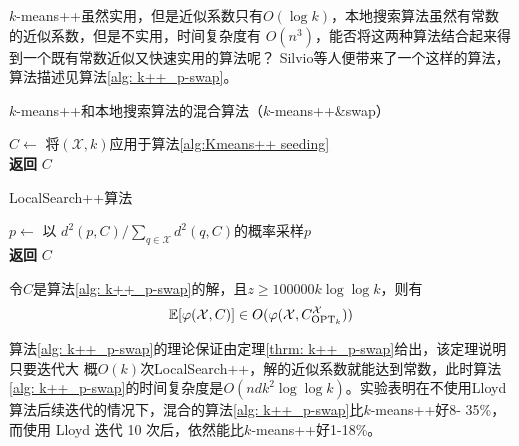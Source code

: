 $k$-means++虽然实用，但是近似系数只有$O(\log k)$，本地搜索算法虽然有常数的近似系数，但是不实用，时间复杂度有
$O(n^3)$，能否将这两种算法结合起来得到一个既有常数近似又快速实用的算法呢？ Silvio等人便带来了一个这样的算法，算法描述见算法\ref{alg: k++_p-swap}。
\begin{algorithm}
    \caption{$k$-means++和本地搜索算法的混合算法（$k$-means++\&swap）}\label{alg: k++_p-swap}
    $C \gets $ 将$(\mathcal{X},k)$应用于算法\ref{alg:Kmeans++ seeding} \\
    \textbf{返回} $C$
\end{algorithm}
\begin{algorithm}
    \caption{LocalSearch++算法}\label{alg: local_search++}
    $p \gets$ 以 $d^2 (p,C)/ \sum_{q \in \mathcal{X}}d^2 (q,C)$的概率采样$p$ \\
    \textbf{返回} $C$
\end{algorithm}
\begin{theorem}
    \label{thrm: k++_p-swap}
     令$C$是算法\ref{alg: k++_p-swap}的解，且$z \geq 100000 k \log\log k$，则有
     \begin{equation}
         \mathbb{E}[\varphi(\mathcal{X},C)] \in O(\varphi(\mathcal{X},C_{\text{OPT}_k}^{\mathcal{X}}))
     \end{equation}
\end{theorem}
算法\ref{alg: k++_p-swap}的理论保证由定理\ref{thrm: k++_p-swap}给出，该定理说明只要迭代大
概$O(k)$次LocalSearch++，解的近似系数就能达到常数，此时算法\ref{alg: k++_p-swap}的时间复杂度是$O(ndk^2 \log\log k)$。实验表明在不使用Lloyd 算法后续迭代的情况下，混合的算法\ref{alg: k++_p-swap}比$k$-means++好8-
35\%，而使用 Lloyd 迭代 10 次后，依然能比$k$-means++好1-18\%。

